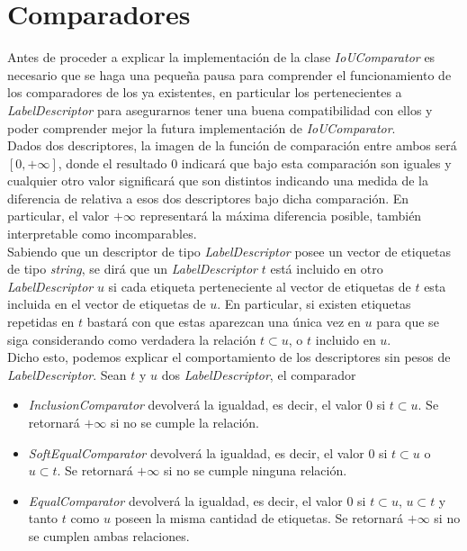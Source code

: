 \section{Comparadores}

Antes de proceder a explicar la implementación de la clase \emph{IoUComparator} es necesario que se haga una pequeña pausa para comprender el funcionamiento de los comparadores de los ya existentes, en particular los pertenecientes a \emph{LabelDescriptor} para asegurarnos tener una buena compatibilidad con ellos y poder comprender mejor la futura implementación de \emph{IoUComparator}.\\

Dados dos descriptores, la imagen de la función de comparación entre ambos será $[0,+\infty]$, donde el resultado $0$ indicará que bajo esta comparación son iguales y cualquier otro valor significará que son distintos indicando una medida de la diferencia de relativa a esos dos descriptores bajo dicha comparación. En particular, el valor $+\infty$ representará la máxima diferencia posible, también interpretable como incomparables.\\

Sabiendo que un descriptor de tipo \emph{LabelDescriptor} posee un vector de etiquetas de tipo \emph{string}, se dirá que un \emph{LabelDescriptor} $t$ está incluido en otro \emph{LabelDescriptor} $u$ si cada etiqueta perteneciente al vector de etiquetas de $t$ esta incluida en el vector de etiquetas de $u$. En particular, si existen etiquetas repetidas en $t$ bastará con que estas aparezcan una única vez en $u$ para que se siga considerando como verdadera la relación $t \subset u$, o $t$ incluido en $u$.\\

Dicho esto, podemos explicar el comportamiento de los descriptores sin pesos de \emph{LabelDescriptor}. Sean $t$ y $u$ dos \emph{LabelDescriptor}, el comparador
\begin{itemize}
\item \emph{InclusionComparator}\label{def:InclusionComparator} devolverá la igualdad, es decir, el valor $0$ si $t\subset u$. Se retornará $+\infty$ si no se cumple la relación.
\item \emph{SoftEqualComparator}\label{def:SoftEqualComparator} devolverá la igualdad, es decir, el valor $0$ si $t\subset u$ o $u\subset t$. Se retornará $+\infty$ si no se cumple ninguna relación.
\item \emph{EqualComparator}\label{def:EqualComparator} devolverá la igualdad, es decir, el valor $0$ si $t \subset u $, $u \subset t$ y tanto $t$ como $u$ poseen la misma cantidad de etiquetas. Se retornará $+\infty$ si no se cumplen ambas relaciones.
\end{itemize}


